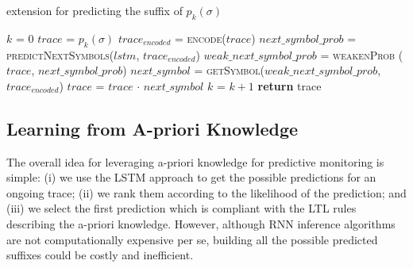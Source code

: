 \begin{algorithm}
	\caption{\nocycle extension for predicting the suffix of $p_k(\sigma)$}
	\begin{algorithmic}[1]
		\State $k$ = 0
		\State $trace$ = $p_k(\sigma)$
		\Do
		\State $trace_{encoded}$ = \textsc{encode}($trace$)
		\State $next\_symbol\_prob$ = \textsc{predictNextSymbols}($lstm$, $trace_{encoded}$)
		\State $weak\_next\_symbol\_prob$ = \textsc{weakenProb} ($trace$, $next\_symbol\_prob$)
		\State $next\_symbol$ = \textsc{getSymbol}($weak\_next\_symbol\_prob$, $trace_{encoded}$)
		\State $trace$ = $trace$ $\cdot$ $next\_symbol$
		\State $k$ = $k + 1$
		\State \textbf{return} trace
		\EndFunction
		

	\end{algorithmic}
	\label{alg:nocycle}
\end{algorithm}


\subsection{Learning from A-priori Knowledge}
\label{ssec:apriori}

The overall idea for leveraging a-priori knowledge for predictive monitoring is simple: (i) we use the LSTM approach to get the possible predictions for an ongoing trace; (ii) we rank them according to the likelihood of the prediction; and (iii) we select the first prediction which is compliant with the LTL rules describing the a-priori knowledge. However, although RNN inference algorithms are not computationally expensive per se, building all the possible predicted suffixes could be costly and inefficient.

